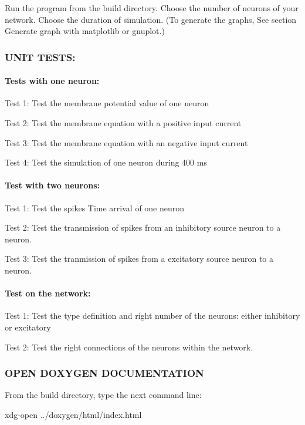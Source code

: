 Run the program from the build directory. Choose the number of neurons of your network. Choose the duration of simulation. (To generate the graphs, See section Generate graph with matplotlib or gnuplot.)

\subsubsection*{U\-N\-I\-T T\-E\-S\-T\-S\-:}

\paragraph*{Tests with one neuron\-:}

Test 1\-: Test the membrane potential value of one neuron

Test 2\-: Test the membrane equation with a positive input current

Test 3\-: Test the membrane equation with an negative input current

Test 4\-: Test the simulation of one neuron during 400 ms

\paragraph*{Test with two neurons\-:}

Test 1\-: Test the spikes Time arrival of one neuron

Test 2\-: Test the transmission of spikes from an inhibitory source neuron to a neuron.

Test 3\-: Test the tranmission of spikes from a excitatory source neuron to a neuron.

\paragraph*{Test on the network\-:}

Test 1\-: Test the type definition and right number of the neurons\-: either inhibitory or excitatory

Test 2\-: Test the right connections of the neurons within the network.

\subsubsection*{O\-P\-E\-N D\-O\-X\-Y\-G\-E\-N D\-O\-C\-U\-M\-E\-N\-T\-A\-T\-I\-O\-N}

From the build directory, type the next command line\-: \begin{DoxyVerb}    xdg-open ../doxygen/html/index.html
\end{DoxyVerb}


